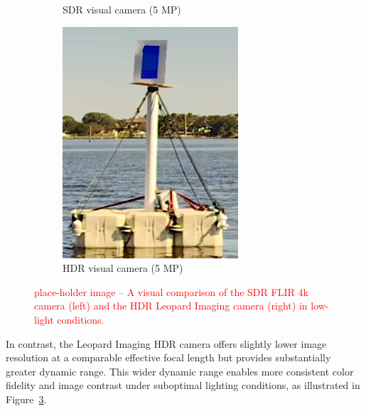\documentclass{erauthesis}
\begin{document}
\begin{figure}[htbp]
{\begin{subfigure}[t]{0.35\textwidth}
        \caption{SDR visual camera (5 MP)}
        \label{fig:SDR_bright}
    \end{subfigure}
    \hspace{2em} %
    \begin{subfigure}[t]{0.378\textwidth}
        \centering
        \includegraphics[width=\textwidth]{Images/HDR_bright.png}
        \caption{HDR visual camera (5 MP)}
        \label{fig:HDR_bright}
    \end{subfigure}%
}
\caption{\textcolor{red}{place-holder image – A visual comparison of the \ac{SDR} FLIR 4k camera (left) and the \ac{HDR} Leopard Imaging camera (right) in low-light conditions.}}
\label{fig:HDR_compare}
\end{figure}

In contrast, the Leopard Imaging \ac{HDR} camera offers slightly lower image resolution at a comparable effective focal length but provides substantially greater dynamic range.
This wider dynamic range enables more consistent color fidelity and image contrast under suboptimal lighting conditions, as illustrated in Figure~\ref{fig:HDR_compare}.
\end{document}
